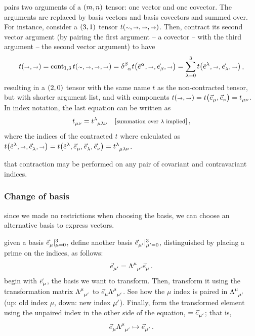  pairs two arguments of a $\torder mn$ tensor: one vector and one covector. The arguments are replaced by basis vectors and basis covectors and summed over. For instance, consider a $\torder 31$ tensor $t\vat{\cslot,\vslot,\vslot,\vslot}$. Then, contract its second vector argument (by pairing the first argument -- a covector -- with the third argument -- the second vector argument) to have
%
\begin{equation}\label{eq:examplefofthecontractionofatensor}
  t\vat{\vslot,\vslot} = \cont_{1,3}t\vat{\cslot,\vslot,\vslot,\vslot}
                       = \tkron\beta\alpha t\vat{\tbcov\alpha, \vslot, \tbvec\beta,\vslot}
                       = \sum_{\lambda = 0}^{3}t\vat{\tbcov\lambda, \vslot, \tbvec\lambda,\vslot}\,,
\end{equation}
%
resulting in a $\torder 20$ tensor with the same name $t$ as the non-contracted tensor, but with shorter argument list, and with components $t\vat{\vslot,\vslot} = t\vat{\tbvec\mu,\tbvec\nu} = \tensor{t}{_\mu_\nu}$. In index notation, the last equation can be written as
%
\begin{equation}\label{eq:examplefofthecontractionofatensorindexnotation}
  \tensor{t}{_\mu_\nu} = \tensor{t}{^\lambda_\mu_\lambda_\nu}\quad\eqtxt{summation over $\lambda$ implied} \,,
\end{equation}
%
where the indices of the contracted $t$ where calculated as $t\vat{\tbcov\lambda,\vslot,\tbvec\lambda,\vslot} = t\vat{\tbcov\lambda,\tbvec\mu,\tbvec\lambda,\tbvec\nu} = \tensor{t}{^\lambda_\mu_\lambda_\nu}$.

 that contraction may be performed on any pair of covariant and contravariant indices.


\subsubsection{Change of basis}
%
 since we made no restrictions when choosing the basis, we can choose an alternative basis to express vectors.

 given a basis $\bset{\tbvec\mu}{\mu = 0}{3}$, define another basis $\bset{\tbvec{\aidx\mu}}{\aidx\mu = 0}{3}$, distinguished by placing a prime on the indices, as follows:
%
\begin{equation}\label{eq:changeofbasisvectors}
  \tbvec{\aidx\mu} = \ttransmat{\mu}{\aidx\mu}\tbvec\mu\,.
\end{equation}
%
 begin with $\tbvec\mu$, the basis we want to transform. Then, transform it using the transformation matrix $\ttransmat{\mu}{\aidx\mu}$ to $\tbvec\mu\ttransmat{\mu}{\aidx\mu}$. See how the $\mu$ index is paired in $\ttransmat{\mu}{\aidx\mu}$ (up: old index $\mu$, down: new index ${\mu}\sp{\prime}$). Finally, form the transformed element using the unpaired index in the other side of the equation, $= \tbvec{\aidx\mu}$; that is,
%
\begin{equation*}
  \tbvec\mu\ttransmat{\mu}{\aidx\mu} \mapsto \tbvec{\aidx\mu}\,.
\end{equation*}

